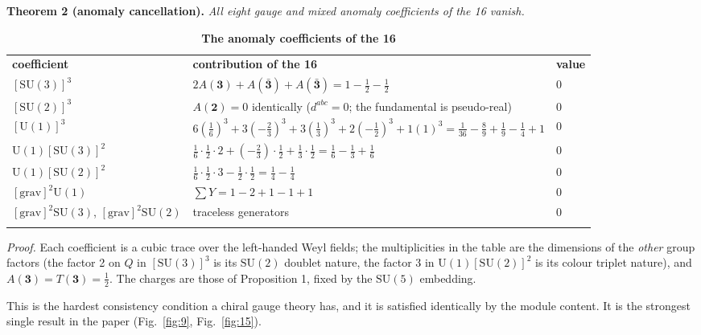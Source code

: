 \documentclass[aps,prd,twocolumn,amsmath,amssymb,superscriptaddress,nofootinbib,floatfix]{revtex4-2}
\newcommand{\grayhline}{\noalign{\vskip1pt{\color{black!30}\hrule height 0.3pt}\color{black}\vskip3pt}}
\begin{document}
\textbf{Theorem 2 (anomaly cancellation).} \emph{All eight gauge and
mixed anomaly coefficients of the 16 vanish.}

\begin{table}[t]
\caption{\textbf{The anomaly coefficients of the 16}}
\label{tab:1}
\footnotesize
\begin{tabular}{@{}p{}p{}p{}@{}}
\toprule
\textbf{coefficient} & \textbf{contribution of the 16} & \textbf{value} \\ \addlinespace[2pt] \midrule
\([\mathrm{SU}(3)]^3\) & \(2A(\mathbf 3) + A(\bar{\mathbf 3}) + A(\bar{\mathbf 3}) = 1 - \tfrac12 - \tfrac12\) & \(0\) \\ \addlinespace[2pt]
\grayhline
\([\mathrm{SU}(2)]^3\) & \(A(\mathbf 2) = 0\) identically (\(d^{abc}=0\); the fundamental is
pseudo-real) & \(0\) \\ \addlinespace[2pt]
\grayhline
\([\mathrm{U}(1)]^3\) & \(6(\tfrac16)^3 + 3(-\tfrac23)^3 + 3(\tfrac13)^3 + 2(-\tfrac12)^3 + 1(1)^3 = \tfrac1{36}-\tfrac89+\tfrac19-\tfrac14+1\) & \(0\) \\ \addlinespace[2pt]
\grayhline
\(\mathrm{U}(1)[\mathrm{SU}(3)]^2\) & \(\tfrac16\cdot\tfrac12\cdot 2 + (-\tfrac23)\cdot\tfrac12 + \tfrac13\cdot\tfrac12 = \tfrac16-\tfrac13+\tfrac16\) & \(0\) \\ \addlinespace[2pt]
\grayhline
\(\mathrm{U}(1)[\mathrm{SU}(2)]^2\) & \(\tfrac16\cdot\tfrac12\cdot 3 - \tfrac12\cdot\tfrac12 = \tfrac14-\tfrac14\) & \(0\) \\ \addlinespace[2pt]
\grayhline
\([\mathrm{grav}]^2\mathrm{U}(1)\) & \(\sum Y = 1 - 2 + 1 - 1 + 1\) & \(0\) \\ \addlinespace[2pt]
\grayhline
\([\mathrm{grav}]^2\mathrm{SU}(3)\), \([\mathrm{grav}]^2\mathrm{SU}(2)\) & traceless generators & \(0\) \\ \addlinespace[2pt] \bottomrule
\end{tabular}
\end{table}

\emph{Proof.} Each coefficient is a cubic trace over the left-handed
Weyl fields; the multiplicities in the table are the dimensions of the
\emph{other} group factors (the factor 2 on \(Q\) in
\([\mathrm{SU}(3)]^3\) is its \(\mathrm{SU}(2)\) doublet nature, the
factor 3 in \(\mathrm{U}(1)[\mathrm{SU}(2)]^2\) is its colour triplet
nature), and \(A(\mathbf 3) = T(\mathbf 3) = \tfrac12\). The charges are
those of Proposition 1, fixed by the \(\mathrm{SU}(5)\) embedding.

This is the hardest consistency condition a chiral gauge theory has, and
it is satisfied identically by the module content. It is the strongest
single result in the paper (Fig.~\ref{fig:9}, Fig.~\ref{fig:15}).
\end{document}
